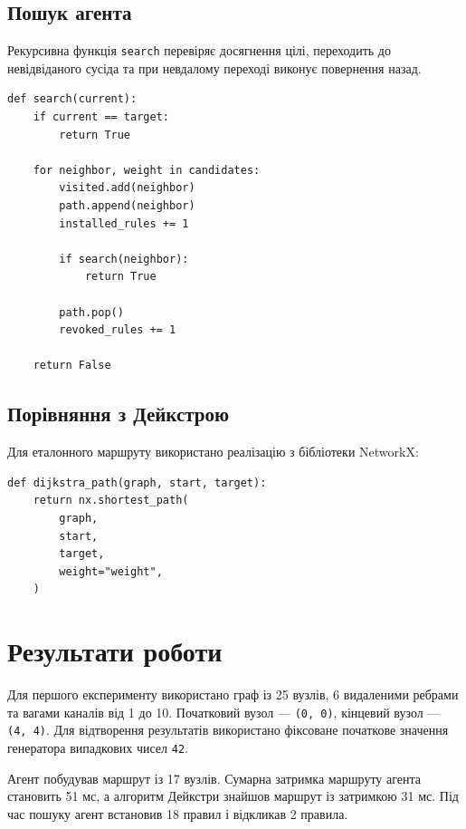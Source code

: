\documentclass[12pt,a4paper]{article}
\begin{document}
\subsection{Пошук агента}

Рекурсивна функція \texttt{search} перевіряє досягнення цілі, переходить до
невідвіданого сусіда та при невдалому переході виконує повернення назад.

\begin{listing}[H]
\begin{verbatim}
def search(current):
    if current == target:
        return True

    for neighbor, weight in candidates:
        visited.add(neighbor)
        path.append(neighbor)
        installed_rules += 1

        if search(neighbor):
            return True

        path.pop()
        revoked_rules += 1

    return False
\end{verbatim}
\caption{Основна логіка пошуку з поверненням}
\end{listing}

\subsection{Порівняння з Дейкстрою}

Для еталонного маршруту використано реалізацію з бібліотеки NetworkX:

\begin{listing}[H]
\begin{verbatim}
def dijkstra_path(graph, start, target):
    return nx.shortest_path(
        graph,
        start,
        target,
        weight="weight",
    )
\end{verbatim}
\caption{Пошук оптимального маршруту за Дейкстрою}
\end{listing}

\section{Результати роботи}

Для першого експерименту використано граф із 25 вузлів, 6 видаленими ребрами
та вагами каналів від 1 до 10. Початковий вузол --- \texttt{(0, 0)}, кінцевий
вузол --- \texttt{(4, 4)}. Для відтворення результатів використано фіксоване
початкове значення генератора випадкових чисел \texttt{42}.

Агент побудував маршрут із 17 вузлів. Сумарна затримка маршруту агента
становить 51 мс, а алгоритм Дейкстри знайшов маршрут із затримкою 31 мс.
Під час пошуку агент встановив 18 правил і відкликав 2 правила.
\end{document}
